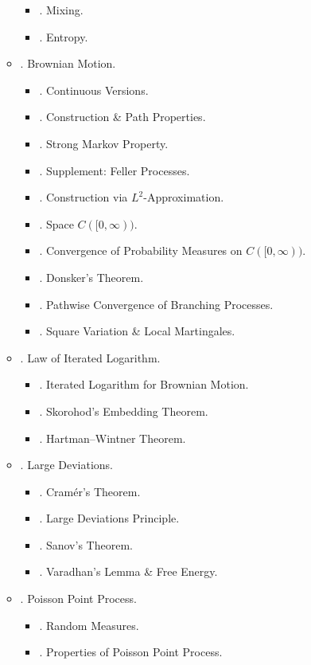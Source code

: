 \documentclass{article}
\begin{document}
\begin{enumerate}
\begin{itemize}
\begin{itemize}
			\item {. Mixing.}
			\item {. Entropy.}
		\end{itemize}
		\item {. Brownian Motion.}
		\begin{itemize}
			\item {. Continuous Versions.}
			\item {. Construction \& Path Properties.}
			\item {. Strong Markov Property.}
			\item {. Supplement: Feller Processes.}
			\item {. Construction via $L^2$-Approximation.}
			\item {. Space $C([0,\infty))$.}
			\item {. Convergence of Probability Measures on $C([0,\infty))$.}
			\item {. Donsker's Theorem.}
			\item {. Pathwise Convergence of Branching Processes.}
			\item {. Square Variation \& Local Martingales.}
		\end{itemize}
		\item {. Law of Iterated Logarithm.}
		\begin{itemize}
			\item {. Iterated Logarithm for Brownian Motion.}
			\item {. Skorohod's Embedding Theorem.}
			\item {. Hartman--Wintner Theorem.}
		\end{itemize}
		\item {. Large Deviations.}
		\begin{itemize}
			\item {. Cram\'er's Theorem.}
			\item {. Large Deviations Principle.}
			\item {. Sanov's Theorem.}
			\item {. Varadhan's Lemma \& Free Energy.}
		\end{itemize}
		\item {. Poisson Point Process.}
		\begin{itemize}
			\item {. Random Measures.}
			\item {. Properties of Poisson Point Process.}

\end{itemize}
\end{itemize}
\end{enumerate}
\end{document}
